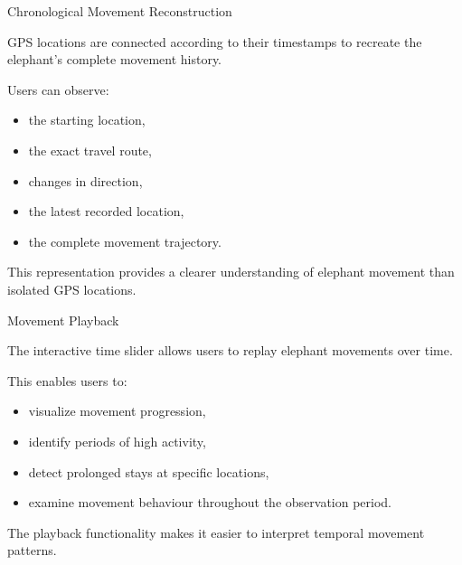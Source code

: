 \documentclass{beamer}
\begin{document}
	
	
	
	
	
	
		\begin{frame}{Chronological Movement Reconstruction}
		
		GPS locations are connected according to their timestamps to recreate the elephant's complete movement history.
		
		Users can observe:
		
		\begin{itemize}
			\item the starting location,
			\item the exact travel route,
			\item changes in direction,
			\item the latest recorded location,
			\item the complete movement trajectory.
		\end{itemize}
		
		This representation provides a clearer understanding of elephant movement than isolated GPS locations.
	\end{frame}	
	
	
	
	
	
	
		\begin{frame}{Movement Playback}
		
		The interactive time slider allows users to replay elephant movements over time.
		
		This enables users to:
		
		\begin{itemize}
			\item visualize movement progression,
			\item identify periods of high activity,
			\item detect prolonged stays at specific locations,
			\item examine movement behaviour throughout the observation period.
		\end{itemize}
		
		The playback functionality makes it easier to interpret temporal movement patterns.
	\end{frame}	
	
	
	
	
	
\end{document}
